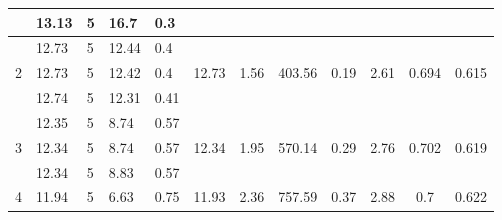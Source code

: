 {\begin{table}[ht]
\begin{tabular}{cllllccccccc}
		& 13.13                    & 5                           & 16.7                    & 0.3                           &                        &                       &                         &                           &                           &                                     &                                \\ \hline
		\multirow{3}{*}{2}   & 12.73                    & 5                           & 12.44                   & 0.4                           & \multirow{3}{*}{12.73} & \multirow{3}{*}{1.56} & \multirow{3}{*}{403.56} & \multirow{3}{*}{0.19}     & \multirow{3}{*}{2.61}     & \multirow{3}{*}{0.694}              & \multirow{3}{*}{0.615}         \\
		& 12.73                    & 5                           & 12.42                   & 0.4                           &                        &                       &                         &                           &                           &                                     &                                \\
		& 12.74                    & 5                           & 12.31                   & 0.41                          &                        &                       &                         &                           &                           &                                     &                                \\ \hline
		\multirow{3}{*}{3}   & 12.35                    & 5                           & 8.74                    & 0.57                          & \multirow{3}{*}{12.34} & \multirow{3}{*}{1.95} & \multirow{3}{*}{570.14} & \multirow{3}{*}{0.29}     & \multirow{3}{*}{2.76}     & \multirow{3}{*}{0.702}              & \multirow{3}{*}{0.619}         \\
		& 12.34                    & 5                           & 8.74                    & 0.57                          &                        &                       &                         &                           &                           &                                     &                                \\
		& 12.34                    & 5                           & 8.83                    & 0.57                          &                        &                       &                         &                           &                           &                                     &                                \\ \hline
		\multirow{3}{*}{4}   & 11.94                    & 5                           & 6.63                    & 0.75                          & \multirow{3}{*}{11.93} & \multirow{3}{*}{2.36} & \multirow{3}{*}{757.59} & \multirow{3}{*}{0.37}     & \multirow{3}{*}{2.88}     & \multirow{3}{*}{0.7}                & \multirow{3}{*}{0.622}         \\

\end{tabular}
\end{table}}
